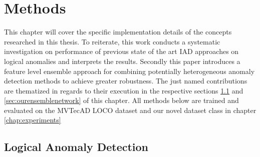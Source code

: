 \chapter{Methods}
\label{chap:method}

This chapter will cover the specific implementation details of the concepts researched in this thesis. To reiterate, this work conducts a systematic investigation on performance of previous state 
of the art IAD approaches on logical anomalies and interprets the results. Secondly this paper introduces a feature level ensemble approach for combining potentially heterogeneous anomaly detection methods to achieve greater robustness. 
The just named contributions 
are thematized in regards to their execution in the respective sections \ref{sec:lcocsurveymethods} and \ref{sec:ourensemblenetwork} of this chapter. All methods below are 
trained and evaluated on the MVTecAD LOCO dataset and our novel dataset class in chapter \ref{chap:experiments}


\section{Logical Anomaly Detection}
\label{sec:lcocsurveymethods}

